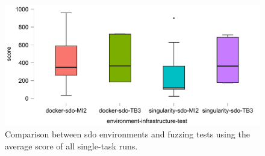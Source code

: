 
\begin{figure}[ht!]
    \centerline{
    \includegraphics[width=\linewidth]{./figures/data/Boxplot_VAR_score_SPLIT_enviroment-infrastructure-test_FILTER_sdo.pdf}    }
    \caption{Comparison between sdo environments and fuzzing tests using the average score of all single-task runs.}
    \label{fig:Boxplot_score_sdo-evn-test}
\end{figure}